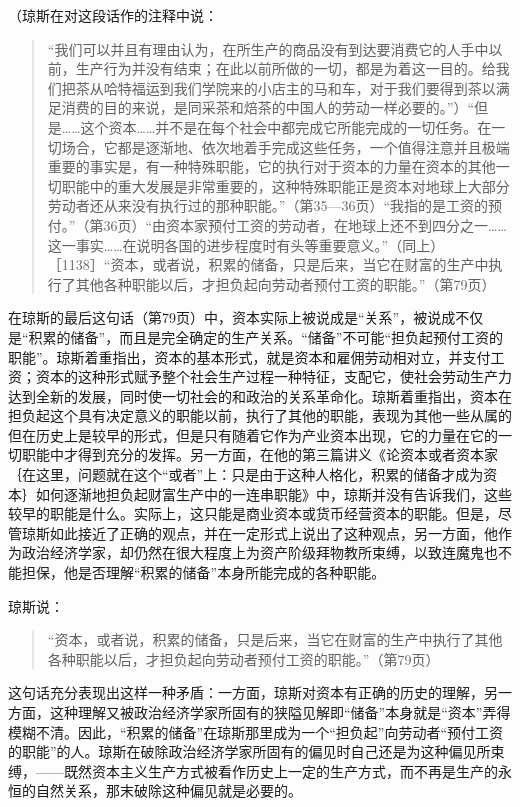 （琼斯在对这段话作的注释中说：

\begin{quote}{“我们可以并且有理由认为，在所生产的商品没有到达要消费它的人手中以前，生产行为并没有结束；在此以前所做的一切，都是为着这一目的。给我们把茶从哈特福运到我们学院来的小店主的马和车，对于我们要得到茶以满足消费的目的来说，是同采茶和焙茶的中国人的劳动一样必要的。”）“但是……这个资本……并不是在每个社会中都完成它所能完成的一切任务。在一切场合，它都是逐渐地、依次地着手完成这些任务，一个值得注意并且极端重要的事实是，有一种特殊职能，它的执行对于资本的力量在资本的其他一切职能中的重大发展是非常重要的，这种特殊职能正是资本对地球上大部分劳动者还从来没有执行过的那种职能。”（第35—36页）“我指的是工资的预付。”（第36页）“由资本家预付工资的劳动者，在地球上还不到四分之一……这一事实……在说明各国的进步程度时有头等重要意义。”（同上）［1138］“资本，或者说，积累的储备，只是后来，当它在财富的生产中执行了其他各种职能以后，才担负起向劳动者预付工资的职能。”（第79页）}\end{quote}

在琼斯的最后这句话（第79页）中，资本实际上被说成是“关系”，被说成不仅是“积累的储备”，而且是完全确定的生产关系。“储备”不可能“担负起预付工资的职能”。琼斯着重指出，资本的基本形式，就是资本和雇佣劳动相对立，并支付工资；资本的这种形式赋予整个社会生产过程一种特征，支配它，使社会劳动生产力达到全新的发展，同时使一切社会的和政治的关系革命化。琼斯着重指出，资本在担负起这个具有决定意义的职能以前，执行了其他的职能，表现为其他一些从属的但在历史上是较早的形式，但是只有随着它作为产业资本出现，它的力量在它的一切职能中才得到充分的发挥。另一方面，在他的第三篇讲义《论资本或者资本家｛在这里，问题就在这个“或者”上：只是由于这种人格化，积累的储备才成为资本｝如何逐渐地担负起财富生产中的一连串职能》中，琼斯并没有告诉我们，这些较早的职能是什么。实际上，这只能是商业资本或货币经营资本的职能。但是，尽管琼斯如此接近了正确的观点，并在一定形式上说出了这种观点，另一方面，他作为政治经济学家，却仍然在很大程度上为资产阶级拜物教所束缚，以致连魔鬼也不能担保，他是否理解“积累的储备”本身所能完成的各种职能。

琼斯说：

\begin{quote}{“资本，或者说，积累的储备，只是后来，当它在财富的生产中执行了其他各种职能以后，才担负起向劳动者预付工资的职能。”（第79页）}\end{quote}

这句话充分表现出这样一种矛盾：一方面，琼斯对资本有正确的历史的理解，另一方面，这种理解又被政治经济学家所固有的狭隘见解即“储备”本身就是“资本”弄得模糊不清。因此，“积累的储备”在琼斯那里成为一个“担负起”向劳动者“预付工资的职能”的人。琼斯在破除政治经济学家所固有的偏见时自己还是为这种偏见所束缚，——既然资本主义生产方式被看作历史上一定的生产方式，而不再是生产的永恒的自然关系，那末破除这种偏见就是必要的。


